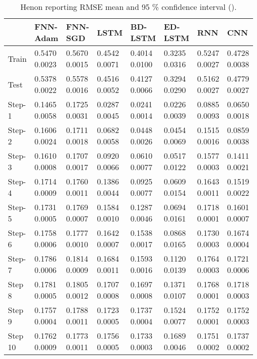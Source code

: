 \documentclass{ieeeaccess}
\begin{document}
\begin{table*}[htbp]
 \smaller 
 \caption{Henon reporting RMSE mean and 95 \% confidence interval   ().}
\label{tab:henon}
\begin{tabular}{llllllll}
\hline
 &  FNN-Adam& FNN-SGD & LSTM & BD-LSTM  & ED-LSTM & RNN & CNN\\
\hline
\hline
		
Train &  0.5470   0.0023 & 0.5670    0.0015  & 0.4542    0.0071  &  0.4014   0.0100 &  0.3235   0.0316  &  0.5247   0.0027 & 0.4728 	0.0038\\

Test &  0.5378   0.0022 & 0.5578   0.0016  & 0.4516   0.0052  &  0.4127  0.0066 &  0.3294   0.0290  &  0.5162   0.0027&  	0.4779 	0.0027 \\

Step-1 &  0.1465   0.0058 & 0.1725    0.0031  & 0.0287    0.0045  & 0.0241   0.0014 &  0.0226   0.0039  & 0.0885   0.0093& 	0.0650 	0.0018  \\

Step-2 &  0.1606   0.0024 & 0.1711    0.0018  & 0.0682    0.0058  &  0.0448   0.0026 &  0.0454   0.0069  &  0.1515 0.0016 & 	0.0859	 0.0038 \\

Step-3 &  0.1610   0.0008 & 0.1707    0.0017  & 0.0920   0.0066  &  0.0610   0.0077 &  0.0517   0.0122  &  0.1577   0.0003&  	0.1411 	0.0021 \\

Step-4 &  0.1714   0.0009 & 0.1760    0.0011  & 0.1386   0.0044  &  0.0925   0.0077&  0.0609  0.0154  &  0.1643   0.0011 & 	0.1519 	0.0022\\

Step-5 &  0.1731   0.0005 &0.1769    0.0007  &0.1584    0.0010  &  0.1287   0.0046 &  0.0694   0.0161  &  0.1718   0.0001 & 	0.1601 	0.0007 \\

Step-6 &  0.1758   0.0006 & 0.1777    0.0010  & 0.1642    0.0007  &  0.1538   0.0017 &  0.0868   0.0165  &  0.1730   0.0003 & 	0.1674 	0.0004 \\

Step-7 &  0.1786   0.0006 & 0.1814    0.0009  & 0.1684  0.0011  &  0.1593   0.0016 &  0.1120   0.0139  &  0.1764   0.0003& 	0.1721 	0.0006  \\

Step 8 &  0.1781   0.0005 & 0.1805    0.0012  & 0.1707    0.0008  &  0.1697   0.0008 &  0.1371   0.0107  &  0.1768   0.0001 & 0.1718 	0.0003\\

Step 9 &  0.1757   0.0004 & 0.1788    0.0011  & 0.1723    0.0005  &  0.1737  0.0004 &  0.1524   0.0077  &  0.1752   0.0001 &  	0.1752 	0.0003\\

Step 10 &  0.1762   0.0009 & 0.1773    0.0011  & 0.1756    0.0005  &  0.1733   0.0003 &  0.1689   0.0046  &  0.1751   0.0002 &  0.1737 	0.0002\\

\hline
 
\end{tabular}

\end{table*}
\end{document}
